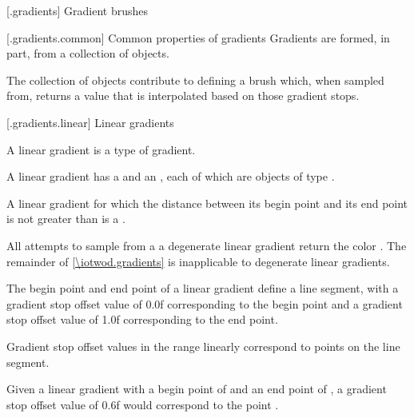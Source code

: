  [\iotwod.gradients] {Gradient brushes}

 [\iotwod.gradients.common] {Common properties of gradients}
\pnum
Gradients are formed, in part, from a collection of  objects.

\pnum
The collection of  objects contribute to defining a brush which, when sampled from, returns a value that is interpolated based on those gradient stops.

 [\iotwod.gradients.linear] {Linear gradients}

\pnum
A linear gradient is a type of gradient.

\pnum
A linear gradient has a  and an , each of which are objects of type .

\pnum
A linear gradient for which the distance between its begin point and its end point is not greater than  is a .

\pnum
All attempts to sample from a a degenerate linear gradient return the color . The remainder of \ref{\iotwod.gradients} is inapplicable to degenerate linear gradients.

\pnum
The begin point and end point of a linear gradient define a line segment, with a gradient stop offset value of 0.0f corresponding to the begin point and a gradient stop offset value of 1.0f corresponding to the end point.

\pnum
Gradient stop offset values in the range  linearly correspond to points on the line segment.

\pnum
\begin{example}
Given a linear gradient with a begin point of  and an end point of , a gradient stop offset value of 0.6f would correspond to the point .
\end{example}


